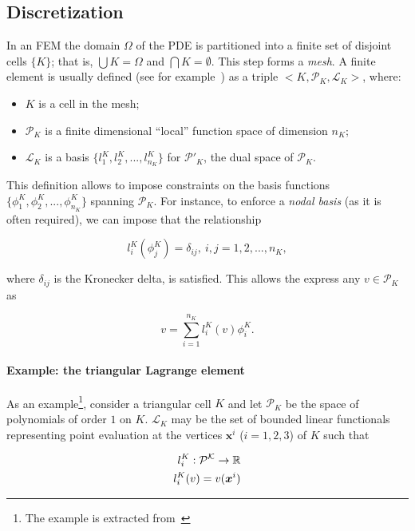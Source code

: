 \subsection{Discretization}
In an FEM the domain $\Omega$ of the PDE is partitioned into a finite set of disjoint cells $\lbrace K \rbrace$; that is, $\bigcup K = \Omega$ and $\bigcap K = \emptyset$. This step forms a {\em mesh}. A finite element is usually defined (see for example~\cite{brenner-and-scott}) as a triple ${<}K,\mathcal{P}_K,\mathcal{L}_K{>}$, where:
\begin{itemize}
\item $K$ is a cell in the mesh;
\item $\mathcal{P}_K$ is a finite dimensional ``local'' function space of dimension $n_K$;
\item $\mathcal{L}_K$ is a basis $\lbrace l_1^K, l_2^K, ..., l_{n_K}^K\rbrace$ for $\mathcal{P}'_K$, the dual space of $\mathcal{P}_K$.
\end{itemize}
This definition allows to impose constraints on the basis functions $\lbrace \phi_1^K, \phi_2^K, ..., \phi_{n_K}^K\rbrace$ spanning $\mathcal{P}_K$. For instance, to enforce a {\em nodal basis} (as it is often required), we can impose that the relationship

\begin{equation}
l_i^K(\phi_j^K) = \delta_{ij},\ i,j = 1,2,...,n_K,
\end{equation}

where $\delta_{ij}$ is the Kronecker delta, is satisfied. This allows the express any $v \in \mathcal{P}_K$ as

\begin{equation}
v = \sum_{i=1}^{n_K} l_i^K(v) \phi_i^K.
\end{equation}

\paragraph{Example: the triangular Lagrange element}
As an example\footnote{The example is extracted from~\cite{fenics-book}}, consider a triangular cell $K$ and let $\mathcal{P}_K$ be the space of polynomials of order $1$ on $K$. $\mathcal{L}_K$ may be the set of bounded linear functionals representing point evaluation at the vertices $\boldsymbol{x}^i$ ($i=1,2,3$) of $K$ such that

\begin{equation}
\centering
\begin{split}
l_i^K : \mathcal{P^K} \rightarrow \mathbb{R} \\
l_i^K(v) = v(\boldsymbol{x}^i)
\end{split}
\end{equation}

